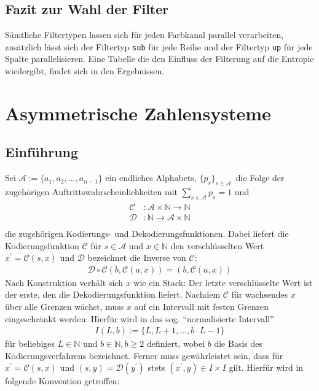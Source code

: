 \documentclass[a4paper,12pt]{article}
\newcommand{\N}{\mathbb N}
\newcommand{\A}{\mathcal A}
\newcommand{\C}{\mathcal C}
\newcommand{\D}{\mathcal D}
\begin{document}
\subsection{Fazit zur Wahl der Filter}
Sämtliche Filtertypen lassen sich für jeden Farbkanal parallel verarbeiten, zusätzlich lässt sich der Filtertyp {\tt{sub}} für jede Reihe und der Filtertyp {\tt{up}} für jede Spalte parallelisieren. Eine Tabelle die den Einfluss der Filterung auf die Entropie wiedergibt, findet sich in den Ergebnissen.
\newpage
\section{Asymmetrische Zahlensysteme}\label{ANS}
\subsection{Einführung}
Sei $\A:=\{a_{1},a_{2},...,a_{n-1}\}$  ein endliches Alphabets, $\{p_{s}\}_{s\in \A}\, $ die Folge der zugehörigen Auftrittswahrscheinlichkeiten mit
$\sum_{s\in \A} p_{s} =1$ und
\begin{align*}
             \begin{array} {ccc}
              \C &:\A \times \N  \rightarrow  \N \\
             \D &: \N\rightarrow\A \times \N\\
              \end{array}
\end{align*}
die zugehörigen Kodierungs- und Dekodierungsfunktionen. Dabei liefert die Kodierungsfunktion $ \C$ für $s\in\A$ und $x\in \N$  den verschlüsselten Wert $x^{'} = \mathcal C(s,x)$ und $\D$ bezeichnet die Inverse von $\C$:
\begin{align*}
\D \circ \C  \left( b, \C(a,x)\right)  = (b, \C(a,x))
\end{align*}
Nach Konstruktion verhält sich $x$ wie ein Stack: Der letzte verschlüsselte Wert ist der erste, den die Dekodierungsfunktion liefert. Nachdem $\C$ für wachsendes $x$ über alle Grenzen wächst, muss $x$ auf ein Intervall mit festen Grenzen eingeschränkt werden: Hierfür wird in \cite{Duda} das sog. "`normalisierte Intervall"' 
\begin{align*}
I(L,b):=\{L,L+1,\ldots,b\cdot L-1\}
\end{align*}
für beliebiges $L \in \N$ und $b\in \N, b\geq 2$ definiert, wobei $b$ die Basis des Kodierungsverfahrens bezeichnet. Ferner muss gewährleistet sein, dass für $x^{'} = \C(s,x)$  und $(s,y) = \D(y^{'})$ stets $(x^{'}, y) \in I\times I$ gilt. Hierfür wird in \cite{Krajcevski} folgende Konvention getroffen:
\end{document}

